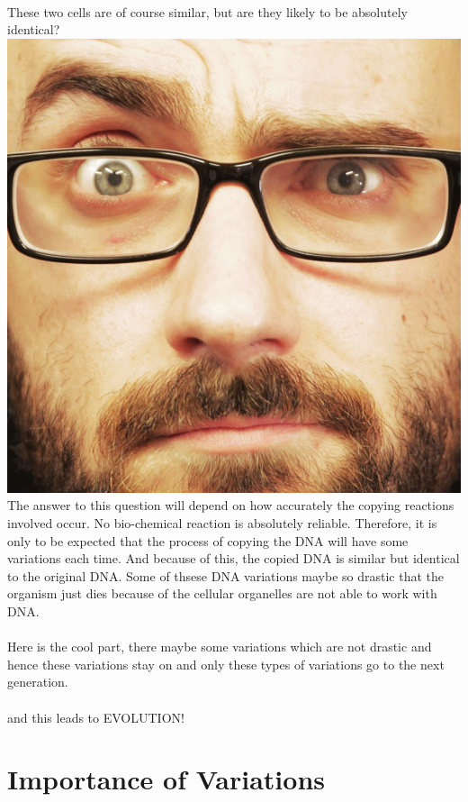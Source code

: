 \documentclass[A4]{article}
\newcommand{\vsauce}{\includegraphics[scale=0.015]{vsauce-eyes.jpg}}
\begin{document}
    \paragraph{}
    These two cells are of course similar, but are they likely to be absolutely identical? \vsauce
    The answer to this question will depend on how accurately the copying reactions involved occur. 
    No bio-chemical reaction is absolutely reliable. 
    Therefore, it is only to be expected that the process of copying the DNA will have some variations each time.
    And because of this, the copied DNA is similar but identical to the original DNA.
    Some of thsese DNA variations maybe so drastic that the organism just dies because of the cellular organelles are not able to work with DNA. 
    \paragraph{}
    Here is the cool part, there maybe some variations which are not drastic and hence these variations stay on and only these types of variations go to the next generation.\\ 
    \paragraph{}
    \Huge{and this leads to EVOLUTION!}
    \section{Importance of Variations}
\end{document}
